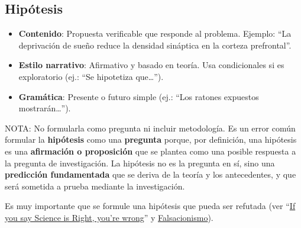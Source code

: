 \documentclass[
  10pt]{article}
\begin{document}
\subsection{Hipótesis}\label{hipuxf3tesis}

\begin{tcolorbox}[enhanced jigsaw, colframe=quarto-callout-tip-color-frame, colback=white, colbacktitle=quarto-callout-tip-color!10!white, leftrule=.75mm, left=2mm, breakable, coltitle=black, toptitle=1mm, bottomtitle=1mm, rightrule=.15mm, titlerule=0mm, title=\textcolor{quarto-callout-tip-color}{\faLightbulb}\hspace{0.5em}{Tip}, arc=.35mm, bottomrule=.15mm, opacitybacktitle=0.6, opacityback=0, toprule=.15mm]

\begin{itemize}
\item
  \textbf{Contenido}: Propuesta verificable que responde al problema.
  Ejemplo: ``La deprivación de sueño reduce la densidad sináptica en la
  corteza prefrontal''.
\item
  \textbf{Estilo narrativo}: Afirmativo y basado en teoría. Usa
  condicionales si es exploratorio (ej.: ``Se hipotetiza que\ldots{}'').
\item
  \textbf{Gramática}: Presente o futuro simple (ej.: ``Los ratones
  expuestos mostrarán\ldots{}'').
\end{itemize}

\end{tcolorbox}

\begin{tcolorbox}[enhanced jigsaw, colframe=quarto-callout-tip-color-frame, colback=white, colbacktitle=quarto-callout-tip-color!10!white, leftrule=.75mm, left=2mm, breakable, coltitle=black, toptitle=1mm, bottomtitle=1mm, rightrule=.15mm, titlerule=0mm, title=\textcolor{quarto-callout-tip-color}{\faLightbulb}\hspace{0.5em}{Tip}, arc=.35mm, bottomrule=.15mm, opacitybacktitle=0.6, opacityback=0, toprule=.15mm]

NOTA: No formularla como pregunta ni incluir metodología. Es un error
común formular la \textbf{hipótesis} como una \textbf{pregunta} porque,
por definición, una hipótesis es una \textbf{afirmación o proposición}
que se plantea como una posible respuesta a la pregunta de
investigación. La hipótesis no es la pregunta en sí, sino una
\textbf{predicción fundamentada} que se deriva de la teoría y los
antecedentes, y que será sometida a prueba mediante la investigación.

Es muy importante que se formule una hipótesis que pueda ser refutada
(ver
``\href{https://www.scientificamerican.com/article/if-you-say-science-is-right-youre-wrong/}{If
you say Science is Right, you're wrong}'' y
\href{https://es.wikipedia.org/wiki/Falsacionismo}{Falsacionismo}).

\end{tcolorbox}
\end{document}
